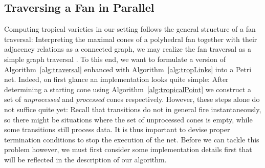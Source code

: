 \documentclass[
  paper=a4,
  titlepage,
  bibliography=totoc,
  pagesize=pdftex
]{scrartcl}
\numberwithin{figure}{section}
\numberwithin{equation}{section}
\numberwithin{table}{section}
\theoremstyle{definition}
\numberwithin{definition}{section}
\begin{document}

\subsection{Traversing a Fan in Parallel}
\label{sec:traverseParal}

Computing tropical varieties in our setting follows the general structure of a fan
traversal: Interpreting the maximal cones of a polyhedral fan together with their
adjacency relations as a connected graph, we may realize the fan traversal as a simple
graph traversal \cite{JenTravSym}. To this end, we want to formulate a version of
Algorithm~\ref{alg:traversal} enhanced with Algorithm~\ref{alg:tropLinks} into a Petri
net. Indeed, on first glance an implementation looks quite simple: After determining a
starting cone using Algorithm~\ref{alg:tropicalPoint} we construct a set of
\emph{unprocessed} and \emph{processed} cones respectively. However, these steps alone do
not suffice quite yet: Recall that transitions do not in general fire instantaneously, so
there might be situations where the set of unprocessed cones is empty, while some
transitions still process data. It is thus important to devise proper termination
conditions to stop the execution of the net. Before we can tackle this problem however, we
must first consider some implementation details first that will be reflected in the
description of our algorithm.
\end{document}
